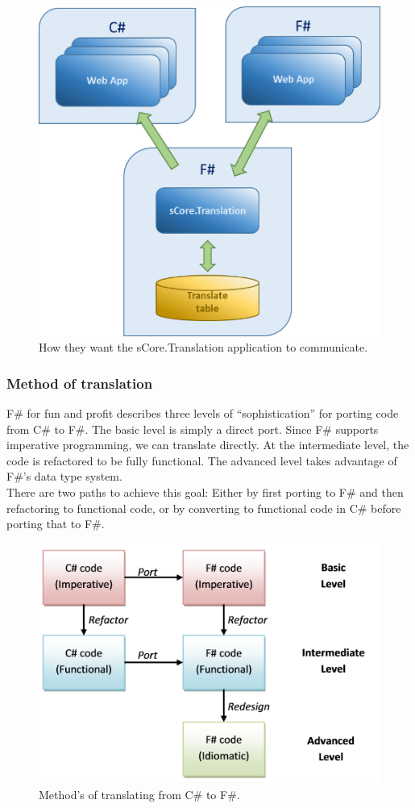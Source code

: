 \documentclass[12pt, a4paper]{article}
\begin{document}
\begin{figure}[!h]
    \includegraphics[scale=0.5]{image02}
    \centering
    \caption{How they want the sCore.Translation application to communicate.}
\end{figure}

\newpage
\subsubsection{Method of translation}
F\# for fun and profit describes three levels of “sophistication” for porting code from C\# to F\#. The basic level is simply a direct port. Since F\# supports imperative programming, we can translate directly. At the intermediate level, the code is refactored to be fully functional. The advanced level takes advantage of F\#’s data type system.\\

There are two paths to achieve this goal: Either by first porting to F\# and then refactoring to functional code, or by converting to functional code in C\# before porting that to F\#.

\begin{figure}[!h]
    \includegraphics[scale=0.6]{image01}
    \centering
    \caption{Method's of translating from C\# to F\#.}
\end{figure}
\end{document}
